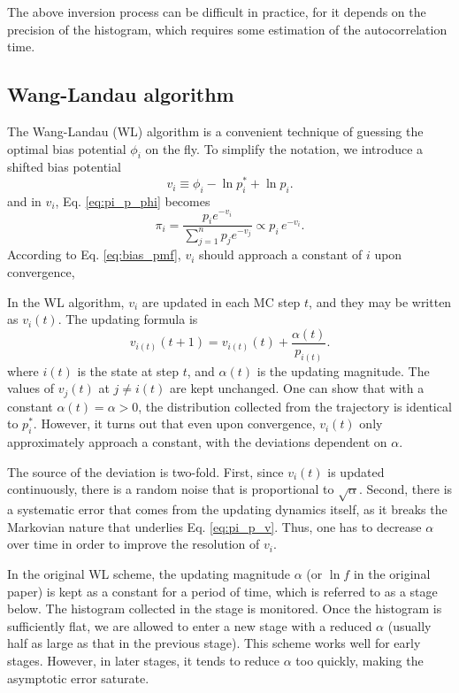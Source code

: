 \documentclass[reprint]{revtex4-1}
\begin{document}
The above inversion process can be difficult
in practice,
for it depends on the precision of the histogram,
which requires some estimation
of the autocorrelation time.

\subsection{Wang-Landau algorithm}


The Wang-Landau (WL) algorithm is a convenient technique
of guessing the optimal bias potential $\phi_i$
on the fly.
%
To simplify the notation, we introduce
a shifted bias potential
%
\begin{equation}
  v_i \equiv \phi_i - \ln p^*_i + \ln p_i.
  \label{eq:vi_def}
\end{equation}
%
%
and in $v_i$, Eq. \eqref{eq:pi_p_phi}
becomes
%
\begin{equation}
  \pi_i = \frac{ p_i e^{-v_i} }
  { \sum_{j = 1}^n p_j e^{-v_j} }
  \propto p_i \, e^{-v_i}.
  \label{eq:pi_p_v}
\end{equation}
%
According to Eq. \eqref{eq:bias_pmf},
$v_i$ should approach a constant of $i$
upon convergence,


In the WL algorithm, $v_i$ are updated
in each MC step $t$,
and they may be written as $v_i(t)$.
%
The updating formula is
%
\begin{equation}
  v_{i(t)}(t+1)
  =
  v_{i(t)}(t)
  +
  \frac{ \alpha(t) } { p_{i(t)} }.
  \label{eq:wl_update}
\end{equation}
%
where $i(t)$ is the state at step $t$,
and $\alpha(t)$ is the updating magnitude.
%
The values of $v_j(t)$ at $j \ne i(t)$
are kept unchanged.
%
One can show that with a constant $\alpha(t) = \alpha > 0$,
the distribution collected from
the trajectory is identical to $p^*_i$.
%
However, it turns out that
even upon convergence,
$v_i(t)$ only approximately approach a constant,
with the deviations dependent on $\alpha$.



The source of the deviation is two-fold.
%
First, since $v_i(t)$ is updated continuously,
there is a random noise that is proportional
to $\sqrt \alpha$.
%
Second, there is a systematic error
that comes from the updating dynamics itself,
as it breaks the Markovian nature
that underlies Eq. \eqref{eq:pi_p_v}.
%
Thus, one has to decrease $\alpha$ over time
in order to improve the resolution of $v_i$.



In the original WL scheme,
the updating magnitude $\alpha$ (or $\ln f$
in the original paper) is kept as a constant
for a period of time,
which is referred to as a stage below.
%
The histogram collected in the stage is monitored.
%
Once the histogram is sufficiently flat,
we are allowed to enter a new stage
with a reduced $\alpha$
(usually half as large as
that in the previous stage).
%
This scheme works well for early stages.
%
However, in later stages, it tends to reduce $\alpha$
too quickly, making the asymptotic error
saturate.
%
\end{document}
